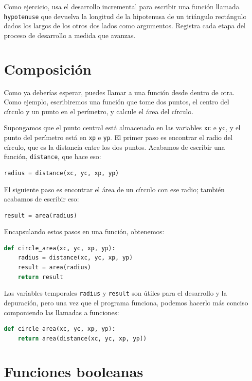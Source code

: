 Como ejercicio, usa el desarrollo incremental para escribir una función llamada \texttt{hypotenuse} que devuelva la longitud de la hipotenusa de un triángulo rectángulo dados los largos de los otros dos lados como argumentos. Registra cada etapa del proceso de desarrollo a medida que avanzas.

\section{Composición}

Como ya deberías esperar, puedes llamar a una función desde dentro de otra. Como ejemplo, escribiremos una función que tome dos puntos, el centro del círculo y un punto en el perímetro, y calcule el área del círculo.

Supongamos que el punto central está almacenado en las variables \texttt{xc} e \texttt{yc}, y el punto del perímetro está en \texttt{xp} e \texttt{yp}. El primer paso es encontrar el radio del círculo, que es la distancia entre los dos puntos. Acabamos de escribir una función, \texttt{distance}, que hace eso:

\begin{lstlisting}[language=Python]
radius = distance(xc, yc, xp, yp)
\end{lstlisting}

El siguiente paso es encontrar el área de un círculo con ese radio; también acabamos de escribir eso:

\begin{lstlisting}[language=Python]
result = area(radius)
\end{lstlisting}

Encapsulando estos pasos en una función, obtenemos:

\begin{lstlisting}[language=Python]
def circle_area(xc, yc, xp, yp):
    radius = distance(xc, yc, xp, yp)
    result = area(radius)
    return result
\end{lstlisting}

Las variables temporales \texttt{radius} y \texttt{result} son útiles para el desarrollo y la depuración, pero una vez que el programa funciona, podemos hacerlo más conciso componiendo las llamadas a funciones:

\begin{lstlisting}[language=Python]
def circle_area(xc, yc, xp, yp):
    return area(distance(xc, yc, xp, yp))
\end{lstlisting}

\section{Funciones booleanas}

